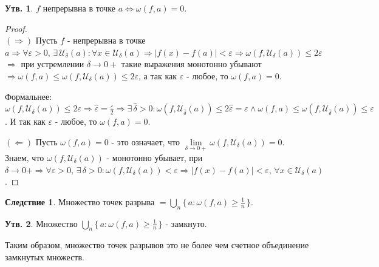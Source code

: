 \documentclass[12pt]{article}
\theoremstyle{definition}
\newtheorem{prop}{Утв.}
\newtheorem{corollary}{Следствие}
\begin{document}
\begin{prop}
	$f$ непрерывна в точке $a \Leftrightarrow \omega(f,a) = 0$.
\end{prop}

\begin{proof}\hfill\\
	$(\Rightarrow)$ Пусть $f$ - непрерывна в точке $a \Rightarrow \forall \varepsilon > 0, \, \exists \, \mathcal{U}_\delta(a) \colon \forall x \in \mathcal{U}_\delta(a) \Rightarrow |f(x) - f(a)| < \varepsilon \Rightarrow \omega(f,\mathcal{U}_\delta(a)) \leq 2\varepsilon$\\
	$\Rightarrow$ при устремлении $\delta \to 0+$ такие выражения монотонно убывают $\Rightarrow \omega(f,a) \leq \omega(f,\mathcal{U}_\delta(a)) \leq 2\varepsilon$, а так как $\varepsilon$ - любое, то $\omega(f,a) = 0$.
	
	Формальнее: $\omega(f,\mathcal{U}_\delta(a)) \leq  2\varepsilon \Rightarrow \hat{\varepsilon} = \frac{\varepsilon}{2} \Rightarrow \exists \, \hat{\delta} > 0\colon \omega(f,\mathcal{U}_{\hat{\delta}}(a)) \leq 2\hat{\varepsilon} =  \varepsilon \wedge \omega(f,a) \leq \omega(f,\mathcal{U}_{\hat{\delta}}(a)) \leq \varepsilon$. И так как $\varepsilon$ - любое, то $\omega(f,a) = 0$.
	
	$(\Leftarrow)$ Пусть $\omega(f,a) = 0$ - это означает, что $\lim\limits_{\delta \to 0+} \omega(f,\mathcal{U}_\delta(a))= 0$. Знаем, что $\omega(f,\mathcal{U}_\delta(a))$ - монотонно убывает, при $\delta \to 0+ \Rightarrow \forall \varepsilon >0, \, \exists \, \delta > 0 \colon \omega(f,\mathcal{U}_\delta(a)) < \varepsilon \Rightarrow |f(x) - f(a)| < \varepsilon, \, \forall x \in \mathcal{U}_\delta(a)$.
\end{proof}

\begin{corollary}
	Множество точек разрыва $ = \bigcup\limits_{n}\{\,a \colon \omega(f,a) \geq \frac{1}{n} \,\}$.
\end{corollary}

\begin{prop}
	Множество $\bigcup\limits_{n}\{\,a \colon \omega(f,a) \geq \frac{1}{n} \,\}$ - замкнуто.
\end{prop}

Таким образом, множество точек разрывов это не более чем счетное объединение замкнутых множеств.
\end{document}
